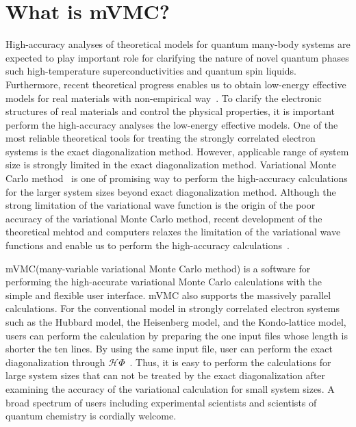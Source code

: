 \chapter{What is mVMC?}
High-accuracy analyses of theoretical models
for quantum many-body systems are expected to
play important role for clarifying the nature of
novel quantum phases such
high-temperature superconductivities and quantum spin liquids.
Furthermore, recent theoretical progress enables us
to obtain low-energy effective models for real materials 
with non-empirical way~\cite{ImadaMiyake}.
To clarify the electronic structures of real materials and
control the physical properties,
it is important perform the
high-accuracy analyses the low-energy effective models.
One of the most reliable theoretical tools for treating
the strongly correlated electron systems is the 
exact diagonalization method.
However, applicable range of system size is strongly limited 
in the exact diagonalization method.
Variational Monte Carlo method~\cite{Gros} is one of promising way
to perform the high-accuracy calculations for the larger
system sizes beyond exact diagonalization method.
Although the strong limitation of the variational wave function
is the origin of the poor accuracy of the variational Monte
Carlo method, recent development of the theoretical mehtod and computers
relaxes the limitation of the variational wave functions and
enable us to perform the high-accuracy calculations~\cite{Tahara2008,Misawa2014,Morita2015}.


mVMC(many-variable variational Monte Carlo method)
is a software for performing the high-accurate 
variational Monte Carlo calculations
with the simple and flexible user interface.
mVMC also supports the massively parallel calculations.
For the conventional model in strongly correlated electron systems
such as the Hubbard model, the Heisenberg model, and the Kondo-lattice model,
users can perform the calculation by preparing the one input files whose length is
shorter the ten lines.
By using the same input file,
user can perform the exact diagonalization
through  $\mathcal{H}\Phi$~\cite{HPhi}.
Thus, it is easy to perform the calculations 
for large system sizes that can not be treated 
by the exact diagonalization after examining the accuracy of the
variational calculation for small system sizes.
A broad spectrum of users including experimental scientists and 
scientists of quantum chemistry is cordially welcome.

